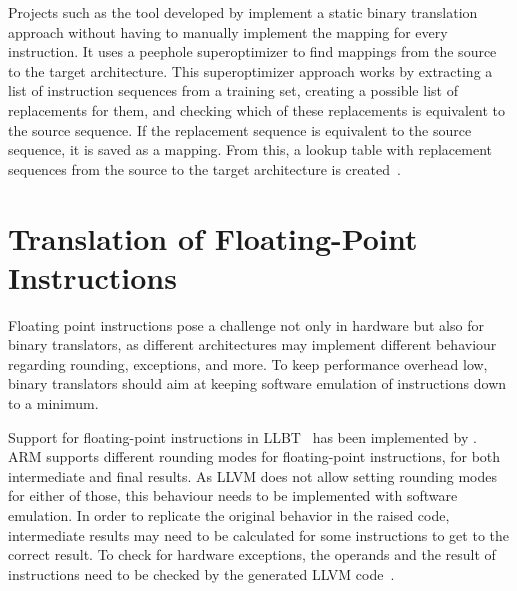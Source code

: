Projects such as the tool developed by \citeauthor{10.5555/1855741.1855754} implement a static binary translation approach without having to manually implement the mapping for every instruction.
It uses a peephole superoptimizer to find mappings from the source to the target architecture.
This superoptimizer approach works by extracting a list of instruction sequences from a training set, creating a possible list of replacements for them, and checking which of these replacements is equivalent to the source sequence.
If the replacement sequence is equivalent to the source sequence, it is saved as a mapping.
From this, a lookup table with replacement sequences from the source to the target architecture is created~\parencite{10.5555/1855741.1855754}.

\section{Translation of Floating-Point Instructions}\label{sec:translation-of-floating-point-instructions}

Floating point instructions pose a challenge not only in hardware but also for binary translators, as different architectures may implement different behaviour regarding rounding, exceptions, and more.
To keep performance overhead low, binary translators should aim at keeping software emulation of instructions down to a minimum.

Support for floating-point instructions in LLBT~\parencite{llbt} has been implemented by \citeauthor{10.1145/3339186.3339192}.
ARM supports different rounding modes for floating-point instructions, for both intermediate and final results.
As LLVM does not allow setting rounding modes for either of those, this behaviour needs to be implemented with software emulation.
In order to replicate the original behavior in the raised code, intermediate results may need to be calculated for some instructions to get to the correct result.
To check for hardware exceptions, the operands and the result of instructions need to be checked by the generated LLVM code~\parencite{10.1145/3339186.3339192}.
